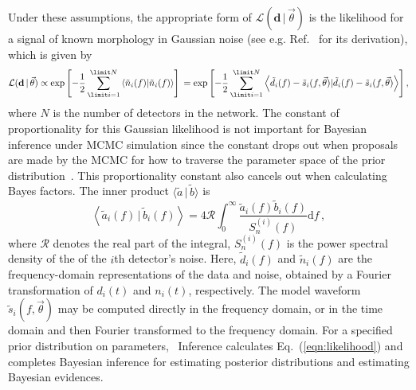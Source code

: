 Under these assumptions, the appropriate form of $\mathcal{L}(\mathbf{d} \, | \, \vec{\theta})$
is the likelihood for a signal of known morphology in Gaussian noise (see
e.g.  Ref.~\cite{Wainstein:1962} for its derivation), which is
given by
\begin{equation}\label{eqn:likelihood}
    \mathcal{L}(\mathbf{d} \, | \, \vec{\theta}) \propto \exp \left[ -\frac{1}{2} \sum_{\limit i = 1}^{\limit N} \left \langle \tilde{n}_{i}(f) | \tilde{n}_{i}(f)\right\rangle \right] \\ 
      = \exp \left[ -\frac{1}{2} \sum_{\limit i = 1}^{\limit N} \left \langle \tilde{d}_{i}(f) - \tilde{s}_{i}(f, \vec{\theta})| \tilde{d}_{i}(f) - \tilde{s}_{i}(f, \vec{\theta})\right \rangle \right] ,
\end{equation}
where $N$ is the number of detectors in the network. The constant of proportionality for this Gaussian likelihood
is not important for Bayesian inference under MCMC simulation since the constant drops out
when proposals are made by the MCMC for how to traverse the parameter space of the prior distribution~\cite{cbiwer_thesis}.
This proportionality constant also cancels out when calculating Bayes factors.
The inner product $\langle\tilde{a} \, | \, \tilde{b}\rangle$ is
\begin{equation}
    \left \langle \tilde{a}_i(f) \, | \, \tilde{b}_i(f)\right \rangle = 4 \mathcal{R} \int_{0}^{\infty} \frac{\tilde{a}_i(f) \tilde{b}_i(f)}{S^{(i)}_n(f)} \mathrm{d}f \,,
\end{equation}
where $\mathcal{R}$ denotes the real part of the integral,
$S^{(i)}_n(f)$ is the power spectral density of the of the $i$th
detector's noise. Here, $\tilde{d}_{i}(f)$ and $\tilde{n}_{i}(f)$ are the
frequency-domain representations of the data and noise, obtained by a Fourier
transformation of $d_{i}(t)$ and $n_{i}(t)$, respectively. The model waveform
$\tilde{s}_{i}(f, \vec{\theta})$ may be computed directly in the frequency
domain, or in the time domain and then Fourier transformed to the frequency
domain. For a specified prior distribution on parameters,
\pycbc{}\ Inference calculates Eq.~(\ref{eqn:likelihood}) and
completes Bayesian inference for estimating posterior distributions and
estimating Bayesian evidences.

